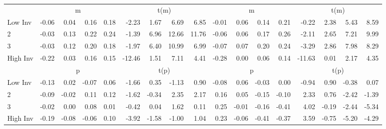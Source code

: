\begin{table}[!ht]
\begin{tabular}{lrrrrrrrrrrrrrrrr}
  
    
      & \multicolumn{4}{c}{m} & \multicolumn{4}{c}{t(m)}
    
      & \multicolumn{4}{c}{m} & \multicolumn{4}{c}{t(m)}
    
    \\
      \cmidrule(r){2-5} \cmidrule(r){6-9} \cmidrule(r){10-13} \cmidrule(r){14-17}

    Low Inv   & -0.06  & 0.04  & 0.16  & 0.18  & -2.23  & 1.67  & 6.69  & 6.85  & -0.01  & 0.06  & 0.14  & 0.21  & -0.22  & 2.38  & 5.43  & 8.59  \\
           2  & -0.03  & 0.13  & 0.22  & 0.24  & -1.39  & 6.96  & 12.66  & 11.76  & -0.06  & 0.06  & 0.17  & 0.26  & -2.11  & 2.65  & 7.21  & 9.99  \\
           3  & -0.03  & 0.12  & 0.20  & 0.18  & -1.97  & 6.40  & 10.99  & 6.99  & -0.07  & 0.07  & 0.20  & 0.24  & -3.29  & 2.86  & 7.98  & 8.29  \\
    High Inv  & -0.22  & 0.03  & 0.16  & 0.15  & -12.46  & 1.51  & 7.11  & 4.41  & -0.28  & 0.00  & 0.06  & 0.14  & -11.63  & 0.01  & 2.17  & 4.35  \\

  
    
      & \multicolumn{4}{c}{p} & \multicolumn{4}{c}{t(p)}
    
      & \multicolumn{4}{c}{p} & \multicolumn{4}{c}{t(p)}
    
    \\
      \cmidrule(r){2-5} \cmidrule(r){6-9} \cmidrule(r){10-13} \cmidrule(r){14-17}

    Low Inv   & -0.13  & 0.02  & -0.07  & 0.06  & -1.66  & 0.35  & -1.13  & 0.90  & -0.08  & 0.06  & -0.03  & 0.00  & -0.94  & 0.90  & -0.38  & 0.07  \\
           2  & -0.09  & -0.02  & 0.11  & 0.12  & -1.62  & -0.34  & 2.35  & 2.17  & 0.16  & 0.05  & -0.15  & -0.10  & 2.33  & 0.76  & -2.42  & -1.39  \\
           3  & -0.02  & 0.00  & 0.08  & 0.01  & -0.42  & 0.04  & 1.62  & 0.11  & 0.25  & -0.01  & -0.16  & -0.41  & 4.02  & -0.19  & -2.44  & -5.34  \\
    High Inv  & -0.19  & -0.08  & -0.06  & 0.10  & -3.92  & -1.58  & -1.00  & 1.04  & 0.23  & -0.06  & -0.41  & -0.37  & 3.59  & -0.75  & -5.20  & -4.29  \\

  

  \bottomrule
\end{tabular}
\label{tbl:32_Size_BM_Inv_B2016}
\end{table}
